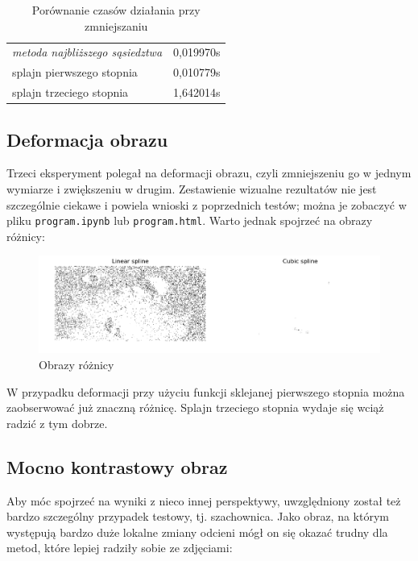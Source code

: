 \documentclass{article}
\begin{document}
\begin{table}[ht]
    \centering
    \begin{tabular}{|l|r|}
        \hline
        \textit{metoda najbliższego sąsiedztwa} & 0,019970s \\
        splajn pierwszego stopnia & 0,010779s \\
        splajn trzeciego stopnia & 1,642014s \\
        \hline
    \end{tabular}
    \caption{Porównanie czasów działania przy zmniejszaniu}
    \label{tab:woman-times}
\end{table}

\subsection{Deformacja obrazu}

Trzeci eksperyment polegał na deformacji obrazu, czyli zmniejszeniu go w jednym wymiarze i zwiększeniu w drugim. Zestawienie wizualne rezultatów nie jest szczególnie ciekawe i powiela wnioski z poprzednich testów; można je zobaczyć w pliku \texttt{program.ipynb} lub \texttt{program.html}. Warto jednak spojrzeć na obrazy różnicy:

\begin{figure}[ht]
    \centering
    \includegraphics[width=\textwidth]{images/moon-diff.png}
    \caption{Obrazy różnicy}
    \label{fig:moon-diff}
\end{figure}

W przypadku deformacji przy użyciu funkcji sklejanej pierwszego stopnia można zaobserwować już znaczną różnicę. Splajn trzeciego stopnia wydaje się wciąż radzić z tym dobrze.

\subsection{Mocno kontrastowy obraz}

Aby móc spojrzeć na wyniki z nieco innej perspektywy, uwzględniony został też bardzo szczególny przypadek testowy, tj. szachownica. Jako obraz, na którym występują bardzo duże lokalne zmiany odcieni mógł on się okazać trudny dla metod, które lepiej radziły sobie ze zdjęciami:
\end{document}
